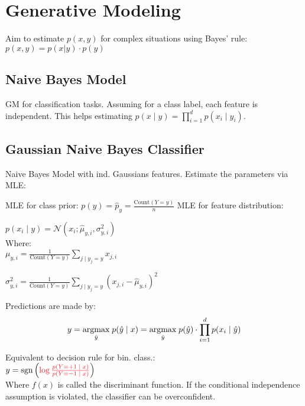 \section*{Generative Modeling}

Aim to estimate $p(x, y)$ for complex situations using Bayes' rule: $p(x,y) = p(x|y) \cdot p(y)$

\subsection*{Naive Bayes Model}

GM for classification tasks. Assuming for a class label, each feature is independent. This helps estimating $p( x \; | \; y) =\prod_{i=1}^d p(x_i \; | \; y_i)$.

\subsection*{Gaussian Naive Bayes Classifier}

Naive Bayes Model with ind. Gaussians features. Estimate the parameters via MLE:

MLE for class prior: $p(y) = \hat p_y = \frac{\text{Count}(Y = y)}{n}$
MLE for feature distribution:

\qquad \qquad $p(x_i \; | \; y) = \mathcal{N}(x_i; \hat \mu_{y,i}, \sigma^2_{y,i})$ \\[-13pt]

Where:\\[-10pt]

\qquad \quad $\mu_{y,i} = \frac{1}{\text{Count}(Y = y)} \sum_{j \; | \; y_j = y} x_{j,i}$

\qquad \quad $\sigma^2_{y,i} = \frac{1}{\text{Count}(Y = y)} \sum_{j \; | \; y_j = y} (x_{j,i} - \hat \mu_{y, i})^2$


Predictions are made by: \\[-20pt]
$$y = \underset{\hat y}{\text{argmax}} \; p(\hat y \; | \; x) = \underset{\hat y}{\text{argmax}} \; p(\hat y) \cdot \prod_{i=1}^d p(x_i \; | \; \hat y)$$

Equivalent to decision rule for bin. class.: \\[-8pt]

\qquad \qquad $y = \sgn \left( \color{Red} \log \frac{p(Y = +1 \; | \; x)}{p(Y = -1 \; | \; x)} \color{Black} \right)$ \\[-3pt]

Where \color{Red}$f(x)$\color{Black} is called the discriminant function. If the conditional independence assumption is violated, the classifier can be overconfident.

